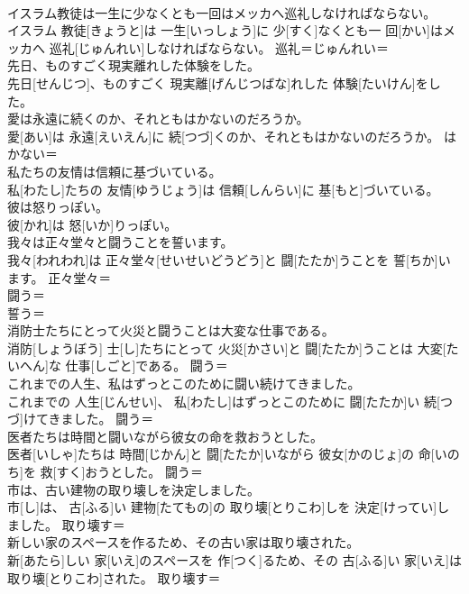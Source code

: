 \documentclass[8pt]{extreport}
\begin{document}
\begin{CJK}{UTF8}{min}
\\	イスラム教徒は一生に少なくとも一回はメッカへ巡礼しなければならない。	
\\	イスラム 教徒[きょうと]は 一生[いっしょう]に 少[すく]なくとも一 回[かい]はメッカへ 巡礼[じゅんれい]しなければならない。	巡礼＝じゅんれい＝ 
\\	先日、ものすごく現実離れした体験をした。	
\\	先日[せんじつ]、ものすごく 現実離[げんじつばな]れした 体験[たいけん]をした。	
\\	愛は永遠に続くのか、それともはかないのだろうか。	
\\	愛[あい]は 永遠[えいえん]に 続[つづ]くのか、それともはかないのだろうか。	はかない＝ 
\\	私たちの友情は信頼に基づいている。	
\\	私[わたし]たちの 友情[ゆうじょう]は 信頼[しんらい]に 基[もと]づいている。	
\\	彼は怒りっぽい。	
\\	彼[かれ]は 怒[いか]りっぽい。	
\\	我々は正々堂々と闘うことを誓います。	
\\	我々[われわれ]は 正々堂々[せいせいどうどう]と 闘[たたか]うことを 誓[ちか]います。	正々堂々＝ 
\\	闘う＝ 
\\	誓う＝ 
\\	消防士たちにとって火災と闘うことは大変な仕事である。	
\\	消防[しょうぼう] 士[し]たちにとって 火災[かさい]と 闘[たたか]うことは 大変[たいへん]な 仕事[しごと]である。	闘う＝ 
\\	これまでの人生、私はずっとこのために闘い続けてきました。	
\\	これまでの 人生[じんせい]、 私[わたし]はずっとこのために 闘[たたか]い 続[つづ]けてきました。	闘う＝ 
\\	医者たちは時間と闘いながら彼女の命を救おうとした。	
\\	医者[いしゃ]たちは 時間[じかん]と 闘[たたか]いながら 彼女[かのじょ]の 命[いのち]を 救[すく]おうとした。	闘う＝ 
\\	市は、古い建物の取り壊しを決定しました。	
\\	市[し]は、 古[ふる]い 建物[たてもの]の 取り壊[とりこわ]しを 決定[けってい]しました。	取り壊す＝ 
\\	新しい家のスペースを作るため、その古い家は取り壊された。	
\\	新[あたら]しい 家[いえ]のスペースを 作[つく]るため、その 古[ふる]い 家[いえ]は 取り壊[とりこわ]された。	取り壊す＝ 

\end{CJK}
\end{document}
